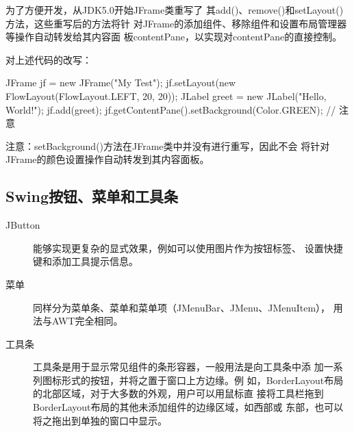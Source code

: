 为了方便开发，从JDK5.0开始JFrame类重写了
其add()、remove()和setLayout()方法，这些重写后的方法{\hei 将针
  对JFrame的添加组件、移除组件和设置布局管理器等操作自动转发给其内容面
  板contentPane，以实现对contentPane的直接控制}。

对上述代码的改写：

\begin{javaCode}
  JFrame jf = new JFrame("My Test");
  jf.setLayout(new FlowLayout(FlowLayout.LEFT, 20, 20));
  JLabel greet = new JLabel("Hello, World!");
  jf.add(greet);
  jf.getContentPane().setBackground(Color.GREEN); // 注意
\end{javaCode}

{\Red\kai 注意：setBackground()方法在JFrame类中并没有进行重写，因此不会
  将针对JFrame的颜色设置操作自动转发到其内容面板。}

\subsection{Swing按钮、菜单和工具条}


\begin{description}
\item[JButton] 能够实现更复杂的显式效果，例如可以使用图片作为按钮标签、
  设置快捷键和添加工具提示信息。
\item[菜单] 同样分为菜单条、菜单和菜单项（JMenuBar、JMenu、JMenuItem），
  用法与AWT完全相同。
\item[工具条] 工具条是用于显示常见组件的条形容器，一般用法是向工具条中添
  加一系列图标形式的按钮，并将之置于窗口上方边缘。{\kai 例
    如，BorderLayout布局的北部区域，对于大多数的外观，用户可以用鼠标直
    接将工具栏拖到BorderLayout布局的其他未添加组件的边缘区域，如西部或
    东部，也可以将之拖出到单独的窗口中显示。}
\end{description}


